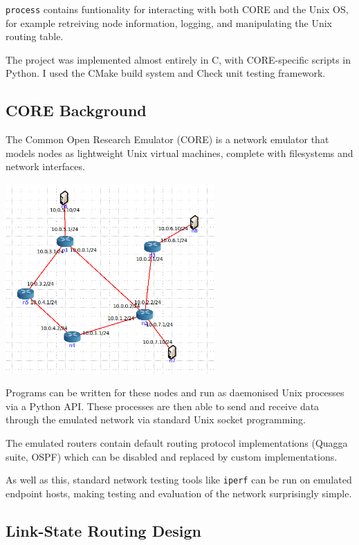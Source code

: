 \documentclass[10pt,twoside,a4paper]{article}
\begin{document}
\texttt{process} contains funtionality for interacting with both CORE and the Unix OS, for example retreiving node information, logging, and manipulating the Unix routing table.

The project was implemented almost entirely in C, with CORE-specific scripts in Python. I used the CMake build system and Check unit testing framework.


\subsection{CORE Background}

The Common Open Research Emulator (CORE) is a network emulator that models nodes as lightweight Unix virtual machines, complete with filesystems and network interfaces.

\begin{minipage}{1\textwidth} \centering
		\includegraphics[width=0.6\textwidth]{6-core}
	\end{minipage}

Programs can be written for these nodes and run as daemonised Unix processes via a Python API. These processes are then able to send and receive data through the emulated network via standard Unix socket programming.

The emulated routers contain default routing protocol implementations (Quagga suite, OSPF) which can be disabled and replaced by custom implementations.

As well as this, standard network testing tools like \texttt{iperf} can be run on emulated endpoint hosts, making testing and evaluation of the network surprisingly simple.

\subsection{Link-State Routing Design}
\end{document}
